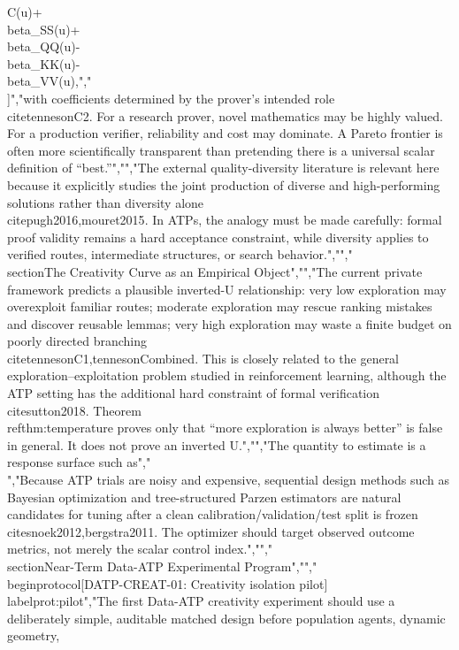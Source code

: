 {{{C(u)+\\beta_SS(u)+\\beta_QQ(u)-\\beta_KK(u)-\\beta_VV(u),","\\]","with coefficients determined by the prover's intended role \\cite{tennesonC2}. For a research prover, novel mathematics may be highly valued. For a production verifier, reliability and cost may dominate. A Pareto frontier is often more scientifically transparent than pretending there is a universal scalar definition of ``best.''","","The external quality-diversity literature is relevant here because it explicitly studies the joint production of diverse and high-performing solutions rather than diversity alone \\cite{pugh2016,mouret2015}. In ATPs, the analogy must be made carefully: formal proof validity remains a hard acceptance constraint, while diversity applies to verified routes, intermediate structures, or search behavior.","","\\section{The Creativity Curve as an Empirical Object}","","The current private framework predicts a plausible inverted-U relationship: very low exploration may overexploit familiar routes; moderate exploration may rescue ranking mistakes and discover reusable lemmas; very high exploration may waste a finite budget on poorly directed branching \\cite{tennesonC1,tennesonCombined}. This is closely related to the general exploration--exploitation problem studied in reinforcement learning, although the ATP setting has the additional hard constraint of formal verification \\cite{sutton2018}. Theorem~\\ref{thm:temperature} proves only that ``more exploration is always better'' is false in general. It does not prove an inverted U.","","The quantity to estimate is a response surface such as","\\[","(u,\\varphi,K,p,T)\\longmapsto","\\left(D,N,\\cY,\\operatorname{ACE},S,K_{\\mathrm{cost}},V,Q\\right).","\\]","Because ATP trials are noisy and expensive, sequential design methods such as Bayesian optimization and tree-structured Parzen estimators are natural candidates for tuning after a clean calibration/validation/test split is frozen \\cite{snoek2012,bergstra2011}. The optimizer should target observed outcome metrics, not merely the scalar control index.","","\\section{Near-Term Data-ATP Experimental Program}","","\\begin{protocol}[DATP-CREAT-01: Creativity isolation pilot]\\label{prot:pilot}","The first Data-ATP creativity experiment should use a deliberately simple, auditable matched design before population agents, dynamic geometry, }}}

